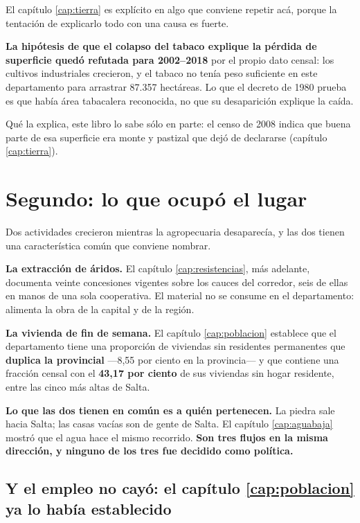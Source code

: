 \begin{cautela}
El capítulo \ref{cap:tierra} es explícito en algo que conviene repetir acá, porque la
tentación de explicarlo todo con una causa es fuerte.

\textbf{La hipótesis de que el colapso del tabaco explique la pérdida de superficie quedó
refutada para 2002--2018} por el propio dato censal: los cultivos industriales crecieron, y el tabaco no tenía peso suficiente en este departamento
para arrastrar 87.357 hectáreas. Lo que el decreto de 1980 prueba es que había área tabacalera
reconocida, no que su desaparición explique la caída.

Qué la explica, este libro lo sabe sólo en parte: el censo de 2008 indica que buena parte de esa superficie era monte y pastizal que dejó de declararse (capítulo \ref{cap:tierra}).
\end{cautela}

\section{Segundo: lo que ocupó el lugar}

Dos actividades crecieron mientras la agropecuaria desaparecía, y las dos tienen una
característica común que conviene nombrar.

\textbf{La extracción de áridos.} El capítulo \ref{cap:resistencias}, más adelante, documenta veinte
concesiones vigentes sobre los cauces del corredor, seis de ellas en manos de una sola
cooperativa. El material no se consume en el departamento: alimenta la obra de la capital y de
la región.

\textbf{La vivienda de fin de semana.} El capítulo \ref{cap:poblacion} establece que el
departamento tiene una proporción de viviendas sin residentes permanentes que \textbf{duplica
la provincial} ---8,55 por ciento en la provincia--- y que contiene una fracción censal con el
\textbf{43,17 por ciento} de sus viviendas sin hogar residente, entre las cinco más altas de Salta.

\textbf{Lo que las dos tienen en común es a quién pertenecen.} La piedra sale hacia Salta; las
casas vacías son de gente de Salta. El capítulo \ref{cap:aguabaja} mostró que el agua hace el
mismo recorrido. \textbf{Son tres flujos en la misma dirección, y ninguno de los tres fue
decidido como política.}

\subsection*{Y el empleo no cayó: el capítulo \ref{cap:poblacion} ya lo había establecido}


